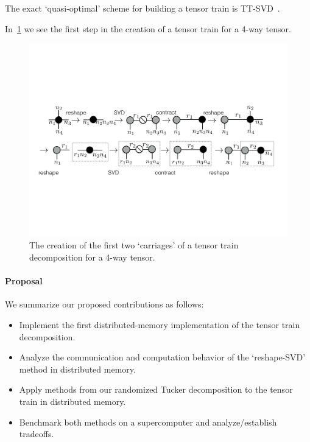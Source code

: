 The exact `quasi-optimal' scheme for building a tensor train is TT-SVD~\cite{tensortrain}.

In~\cref{fig:ttsequence} we see the first step in the creation of a tensor train for a 4-way tensor. 

\begin{figure}
  \centering 
  \includegraphics[width=\linewidth]{thpropfigs/ttsequence}
  \caption{The creation of the first two `carriages' of a tensor train decomposition for a 4-way tensor.}
  \label{fig:ttsequence}
\end{figure}

\paragraph{Proposal}
We summarize our proposed contributions as follows:
\begin{itemize}
  \item Implement the first distributed-memory implementation of the tensor train decomposition.
  \item Analyze the communication and computation behavior of the `reshape-SVD' method in distributed memory.
  \item Apply methods from our randomized Tucker decomposition to the tensor train in distributed memory.
  \item Benchmark both methods on a supercomputer and analyze/establish tradeoffs.
\end{itemize}